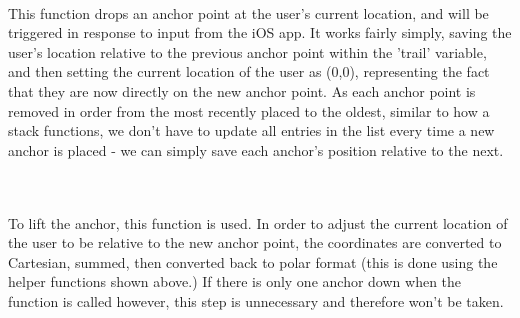 \documentclass[letterpaper,12pt]{article}
\begin{document}
 \\

This function drops an anchor point at the user's current location, and will be triggered in response to input from the iOS app. It works fairly simply, saving the user's location relative to the previous anchor point within the 'trail' variable, and then setting the current location of the user as (0,0), representing the fact that they are now directly on the new anchor point. As each anchor point is removed in order from the most recently placed to the oldest, similar to how a stack functions, we don't have to update all entries in the list every time a new anchor is placed - we can simply save each anchor's position relative to the next.\newline \par

 \\

 \\

To lift the anchor, this function is used. In order to adjust the current location of the user to be relative to the new anchor point, the coordinates are converted to Cartesian, summed, then converted back to polar format (this is done using the helper functions shown above.) If there is only one anchor down when the function is called however, this step is unnecessary and therefore won't be taken. \newline \par

 \\
\end{document}
